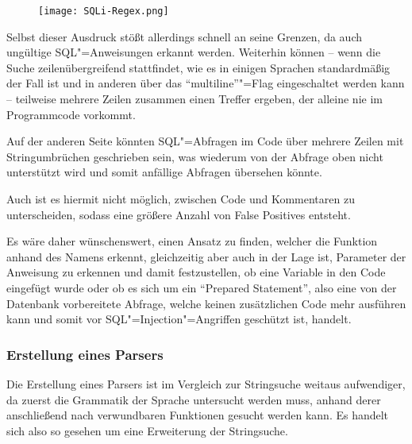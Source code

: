                \begin{figure}[htp]
                    \centering%
                    \texttt{[image: SQLi-Regex.png]}
                    \label{fig:SQLi-Regex}
                \end{figure}

                Selbst dieser Ausdruck stößt allerdings schnell an seine Grenzen,
                da auch ungültige
                \gls{SQL}"=Anweisungen erkannt werden.
                Weiterhin können
                -- wenn die Suche zeilenübergreifend stattfindet,
                wie es in einigen Sprachen standardmäßig der Fall ist und
                in anderen über das
                \foreignquote{english}{multiline}"=Flag eingeschaltet werden kann
                -- teilweise mehrere Zeilen zusammen einen Treffer ergeben,
                der alleine nie im Programmcode vorkommt.

                Auf der anderen Seite könnten
                \gls{SQL}"=Abfragen im Code über mehrere Zeilen mit Stringumbrüchen geschrieben sein,
                was wiederum von der Abfrage oben nicht unterstützt wird und
                somit anfällige Abfragen übersehen könnte.

                Auch ist es hiermit nicht möglich,
                zwischen Code und Kommentaren zu unterscheiden,
                sodass eine größere Anzahl von False Positives entsteht.

                Es wäre daher wünschenswert,
                einen Ansatz zu finden,
                welcher die Funktion anhand des Namens erkennt,
                gleichzeitig aber auch in der Lage ist,
                Parameter der Anweisung zu erkennen und
                damit festzustellen,
                ob eine Variable in den Code eingefügt wurde oder
                ob es sich um ein \foreignquote{english}{Prepared Statement},
                also eine von der Datenbank vorbereitete Abfrage,
                welche keinen zusätzlichen Code mehr ausführen kann und
                somit vor \gls{SQL}"=Injection"=Angriffen geschützt ist,
                handelt.

            \subsubsection{Erstellung eines Parsers}
                Die Erstellung eines Parsers ist im Vergleich zur Stringsuche weitaus aufwendiger,
                da zuerst die Grammatik der Sprache untersucht werden muss,
                anhand derer anschließend nach verwundbaren Funktionen gesucht werden kann.
                Es handelt sich also so gesehen um eine Erweiterung der Stringsuche.

